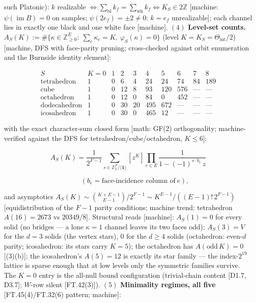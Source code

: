 \begin{theorem}
such Platonic): $k$ realizable $\iff\sum_{\mathrm{bl}}k_f=\sum_{\mathrm{wh}}k_f\iff K_S\in2\mathbb Z$ [machine: $\psi(\operatorname{im}B)=0$ on samples; $\psi(2e_f)=\pm2\ne0$: $k=e_f$ unrealizable]; each channel lies in exactly one black and one white face [machine]. $(4)$ \textbf{Level-set counts.} $A_S(K):=\#\{\kappa\in\mathbb Z_{\ge0}^E:\ \sum_e\kappa_e=K,\ \varphi_S(\kappa)=0\}$ (level $K=K_S=\Theta_{\mathrm{int}}/2$) [machine, DFS with face-parity pruning; cross-checked against orbit enumeration and the Burnside identity element]:

\[
\begin{array}{c|ccccccccc}
S & K{=}0 & 1 & 2 & 3 & 4 & 5 & 6 & 7 & 8\\ \hline
\text{tetrahedron} & 1 & 0 & 6 & 4 & 24 & 24 & 74 & 84 & 189\\
\text{cube} & 1 & 0 & 12 & 8 & 93 & 120 & 576 & — & —\\
\text{octahedron} & 1 & 0 & 12 & 0 & 84 & 0 & 452 & — & —\\
\text{dodecahedron} & 1 & 0 & 30 & 20 & 495 & 672 & — & — & —\\
\text{icosahedron} & 1 & 0 & 30 & 0 & 465 & 12 & — & — & —
\end{array}
\]

with the exact character-sum closed form [math: GF(2) orthogonality; machine-verified against the DFS for tetrahedron/cube/octahedron, $K\le6$]:

\[
A_S(K)=\frac{1}{2^{F-1}}\sum_{s\in\mathbb Z_2^F/\langle\mathbf1\rangle}[z^K]\prod_{e\in E}\frac{1}{1-(-1)^{s\cdot b_e}\,z}
\]

\[
\qquad (b_e=\text{face-incidence column of}\ e),
\]

and asymptotics $A_S(K)\sim\binom{K+E-1}{E-1}/2^{F-1}\sim K^{E-1}/((E-1)!\,2^{F-1})$ [equidistribution of the $F-1$ parity conditions; machine trend: tetrahedron $A(16)=2673$ vs $20349/8$]. Structural reads [machine]: $A_S(1)=0$ for every solid (no bridges — a lone $\kappa{=}1$ channel leaves its two faces odd); $A_S(3)=V$ for the $d{=}3$ solids (the vertex stars), $0$ for the $d\ge4$ solids (octahedron: even-$d$ parity; icosahedron: its stars carry $K{=}5$); the octahedron has $A(\text{odd}\,K)=0$ [(3)(b)]; the icosahedron's $A(5)=12$ is exactly its star family — the index-$2^{19}$ lattice is sparse enough that at low levels only the symmetric families survive. The $K{=}0$ entry is the all-null bound configuration (trivial-chain content [D1.7, D3.7]; $W$-row silent [FT.42(3)]). $(5)$ \textbf{Minimality regimes, all five} [FT.45(4)/FT.32(6) pattern; machine]:


\end{theorem}
